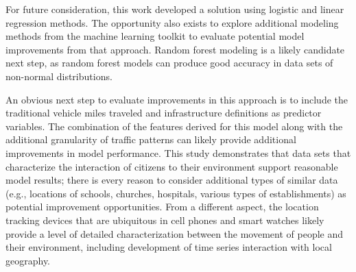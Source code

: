 \documentclass{llncs}
\begin{document}
For future consideration, this work developed a solution using logistic and linear regression methods. The opportunity also exists to explore additional modeling methods from the machine learning toolkit to evaluate potential model improvements from that approach. Random forest modeling is a likely candidate next step, as random forest models can produce good accuracy in data sets of non-normal distributions. 

An obvious next step to evaluate improvements in this approach is to include the traditional vehicle miles traveled and infrastructure definitions as predictor variables. The combination of the features derived for this model along with the additional granularity of traffic patterns can likely provide additional improvements in model performance. This study demonstrates that data sets that characterize the interaction of citizens to their environment support reasonable model results; there is every reason to consider additional types of similar data (e.g., locations of schools, churches, hospitals, various types of establishments) as potential improvement opportunities. From a different aspect, the location tracking devices that are ubiquitous in cell phones and smart watches likely provide a level of detailed characterization between the movement of people and their environment, including development of time series interaction with local geography.


%


\end{document}
